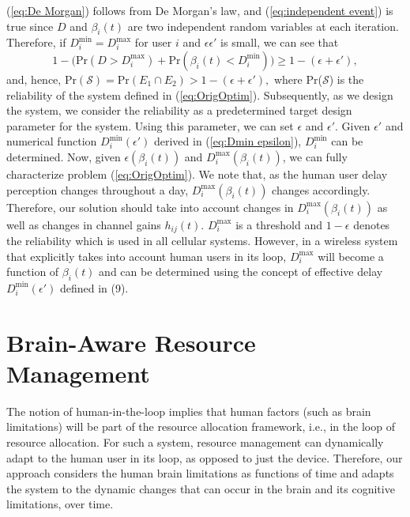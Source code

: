 \documentclass[journal,draftclsnofoot,onecolumn,12pt]{IEEEtran}%
\begin{document}
(\ref{eq:De Morgan}) follows from De Morgan's law, and (\ref{eq:independent event}) is true since $D$ and $\beta_i(t)$ are two independent random variables {at each iteration}.
Therefore, if $D_i^{\min}=D_i^{\max}$ for user $i$ and $\epsilon\epsilon'$ is small,  we can see that
\begin{equation}\label{eq:findAllthings}
1-\Big(\text{Pr}(D>D_i^{\max})+\text{Pr}(\beta_i(t)<D_i^{\min})\Big)\geq 
1- (\epsilon +\epsilon'),
\end{equation}
and, hence, {
$
\text{Pr}(\mathcal{S})=\text{Pr}(E_1 \cap E_2)> 1- (\epsilon +\epsilon'),
$}
where {Pr}($\mathcal{S}$) is the reliability of the system defined in (\ref{eq:OrigOptim}).
Subsequently, as we design the system, we consider the reliability as a predetermined target design parameter for the system. Using this parameter, we can set $\epsilon$ and $\epsilon'$. Given $\epsilon'$ and numerical function $D_i^{\min}(\epsilon')$  derived in (\ref{eq:Dmin epsilon}), $D_i^{\min}$ can be determined. 
Now, given $\epsilon(\beta_i(t))$ and $D_i^{\max}(\beta_i(t))$, we can fully characterize problem (\ref{eq:OrigOptim}).
We note that, as the human user delay perception changes throughout a day, $D_i^{\max}(\beta_i(t))$ changes accordingly. Therefore, our solution should take into account changes in $D_i^{\max}(\beta_i(t))$ as well as changes in channel gains $h_{ij}(t)$. { $D_i^{\max}$ is a threshold and $1- \epsilon$ denotes the reliability which is used in all cellular systems.  However, in a wireless system that explicitly takes into account human users in its loop, $D_i^{\max}$ will become a function of $\beta_i(t)$ and can be determined using the concept of effective delay  $D_i^{\min} (\epsilon')$ defined in (9).}




    \section{Brain-Aware Resource Management}\label{sec:BrainAwRA}
	{The notion of human-in-the-loop implies that human factors (such as brain limitations) will be part of the resource allocation framework, i.e., in the loop of resource allocation. For such a system, resource management can dynamically adapt to the human user in its loop, as opposed to just the device. Therefore, our approach considers the human brain limitations as functions of time and adapts the system to the dynamic changes that can occur in the brain and its cognitive limitations, over time.}
	
\end{document}
